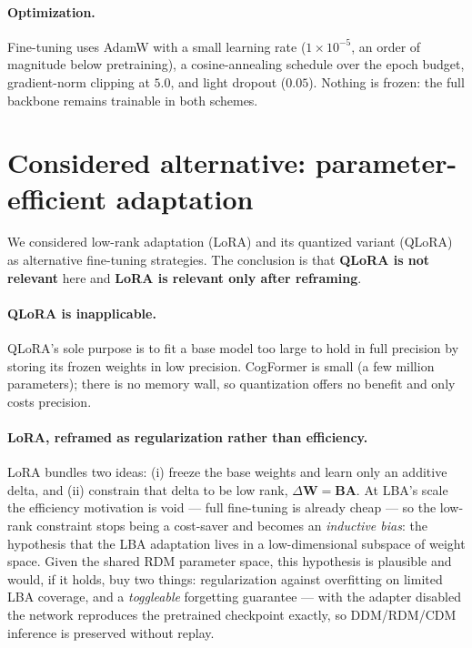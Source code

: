 \documentclass[11pt]{article}
\newcommand{\rmW}{\mathbf{W}}
\begin{document}
\paragraph{Optimization.}
Fine-tuning uses AdamW with a small learning rate ($1\times10^{-5}$, an order of
magnitude below pretraining), a cosine-annealing schedule over the epoch budget,
gradient-norm clipping at $5.0$, and light dropout ($0.05$). Nothing is frozen:
the full backbone remains trainable in both schemes.

\section{Considered alternative: parameter-efficient adaptation}

We considered low-rank adaptation (LoRA) and its quantized variant (QLoRA) as
alternative fine-tuning strategies. The conclusion is that \textbf{QLoRA is not
relevant} here and \textbf{LoRA is relevant only after reframing}.

\paragraph{QLoRA is inapplicable.}
QLoRA's sole purpose is to fit a base model too large to hold in full precision
by storing its frozen weights in low precision. CogFormer is small (a few
million parameters); there is no memory wall, so quantization offers no benefit
and only costs precision.

\paragraph{LoRA, reframed as regularization rather than efficiency.}
LoRA bundles two ideas: (i) freeze the base weights and learn only an additive
delta, and (ii) constrain that delta to be low rank, $\Delta\rmW = \mathbf{B}
\mathbf{A}$. At LBA's scale the efficiency motivation is void --- full
fine-tuning is already cheap --- so the low-rank constraint stops being a
cost-saver and becomes an \emph{inductive bias}: the hypothesis that the LBA
adaptation lives in a low-dimensional subspace of weight space. Given the shared
RDM parameter space, this hypothesis is plausible and would, if it holds, buy
two things: regularization against overfitting on limited LBA coverage, and a
\emph{toggleable} forgetting guarantee --- with the adapter disabled the network
reproduces the pretrained checkpoint exactly, so DDM/RDM/CDM inference is
preserved without replay.
\end{document}
